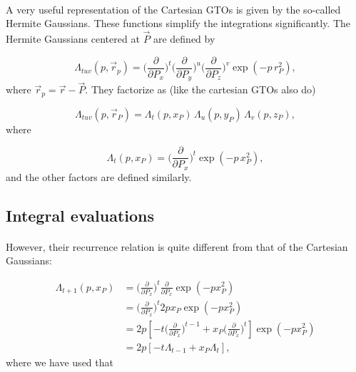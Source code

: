 \documentclass[%
twoside,                 %
final,                   %
10pt]{article}
\begin{document}
\paragraph{}

A very useful representation of the Cartesian GTOs is given by the so-called Hermite Gaussians. These functions simplify 
the integrations significantly. The Hermite Gaussians centered at $\vec P$ are defined by

\begin{equation}
 \Lambda_{tuv}(p, \vec r_p) = \Big(\frac{\partial}{\partial P_x}\Big)^t \Big(\frac{\partial}{\partial P_y}\Big)^u \Big(\frac{\partial}{\partial P_z}\Big)^v \exp(-p\, r^2_P),
\end{equation}
where $\vec r_p = \vec r - \vec P$. They factorize as (like the cartesian GTOs also do)

\begin{equation}
 \Lambda_{tuv}(p, \vec r_P) = \Lambda_t(p,x_P)\,\Lambda_u(p,y_P)\,\Lambda_v(p,z_P),
\end{equation}
where

\begin{equation}
\label{eq:HermiteGaussian_x}
 \Lambda_t(p,x_P) = \Big(\frac{\partial}{\partial P_x}\Big)^t \exp(-p\,x^2_P),
\end{equation}
and the other factors are defined similarly.



\subsection*{Integral evaluations}

\paragraph{}

However, their recurrence relation is quite different from that of the Cartesian Gaussians:

\begin{equation}
\begin{split}
 \Lambda_{t+1}(p,x_P) & = \Big(\frac{\partial}{\partial P_x}\Big)^t \frac{\partial}{\partial P_x}\exp(-px^2_P) \\
                      & = \Big(\frac{\partial}{\partial P_x}\Big)^t 2px_P \exp(-px^2_P)  \\
                      & = 2p[-t\Big(\frac{\partial}{\partial P_x}\Big)^{t-1} + x_P \Big(\frac{\partial}{\partial P_x}\Big)^t] \exp(-px^2_P) \\
                      & = 2p[-t\Lambda_{t-1} + x_P \Lambda_t],
\end{split}
\end{equation}
where we have used that
\end{document}
